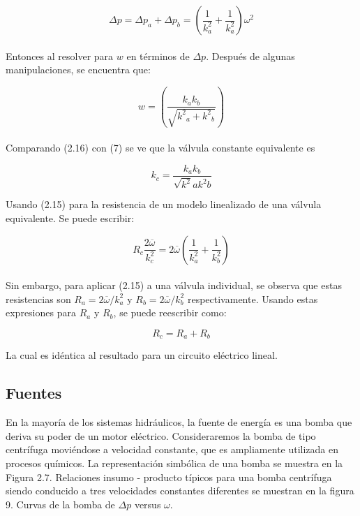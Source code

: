 \documentclass[a4paper,12pt,twoside]{proyectotanquesecci}
\begin{document}
\begin{equation}
\Delta p= \Delta p_{a}+\Delta p_{b} = \left(\frac{1}{k^{2}_{a}}+\frac{1}{k^{2}_{a}}\right)\omega^{2}
\end{equation} \\

Entonces al resolver para $w$ en términos de $\Delta p$. Después de algunas manipulaciones, se encuentra que:

\begin{equation}
w=\left(\frac{{k_{a}k_{b}}}{\sqrt{{k^{2}}_{a}+{k^{2}}_{b}}} \right)
\end{equation} \\

Comparando (2.16) con (7) se ve que la válvula constante equivalente es

\begin{equation}
k_{c}=\frac{k_{a} k_{b}}{\sqrt{k^{2}}a{k^{2}}b}
\end{equation}

Usando (2.15) para la resistencia de un modelo linealizado de una válvula equivalente. Se puede escribir:

\begin{equation}
R_{c}\frac{2\overline{\omega}}{k^{2}_{c}}=
2\overline{\omega}(\frac{1}{k^{2}_{a}}+\frac{1}{k^{2}_{b}})
\end{equation} \\

Sin embargo, para aplicar (2.15) a una válvula individual, se observa que estas resistencias son $R_{a}=2\overline{\omega}/k^{2}_{a}$ y $R_{b}=2\overline{\omega}/k^{2}_{b}$ respectivamente. Usando estas expresiones para $R_{a}$ y $R_{b}$, se puede reescribir como:

\begin{equation}
R_{c}=R_{a}+R_{b}
\end{equation}

La cual es idéntica al resultado para un circuito eléctrico lineal. \\

\subsection{Fuentes}

En la mayoría de los sistemas hidráulicos, la fuente de energía es una bomba que deriva su poder de un motor eléctrico. Consideraremos la bomba de tipo centrífuga moviéndose a velocidad constante, que es ampliamente utilizada en procesos químicos. La representación simbólica de una bomba se muestra en la Figura 2.7. Relaciones insumo - producto típicos para una bomba centrífuga siendo conducido a tres velocidades constantes diferentes se muestran en la figura 9. Curvas de la bomba de $\Delta p$ versus $\omega$.
\end{document}
